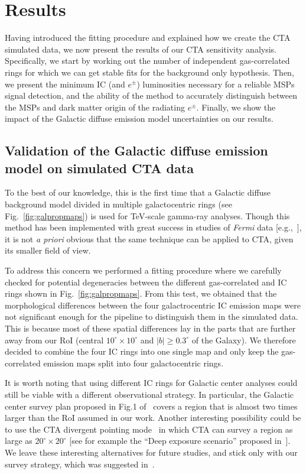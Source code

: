 \documentclass[doublespace,nopageskip]{VTthesis}
\begin{document}
\section{Results}
\label{sec:results_CTA}

Having introduced the fitting procedure and explained how we create the CTA simulated data, we now present the results of our CTA sensitivity analysis.
Specifically, we start by working out the number of independent gas-correlated rings for which we can get stable fits for the background only hypothesis. Then, we present the minimum IC (and $e^\pm$) luminosities necessary for a reliable MSPs signal detection, and the ability of the method to accurately distinguish between the MSPs and dark matter origin of the radiating $e^\pm$. Finally, we show the impact of the Galactic diffuse emission model uncertainties on our results.

\subsection{Validation of the Galactic diffuse emission model on simulated CTA data}
\label{subsec:validationGDE}

To the best of our knowledge, this is the first time that a Galactic diffuse background model divided in multiple galactocentric rings (see Fig.~\ref{fig:galpropmaps}) is used for TeV-scale gamma-ray analyses. Though this method has been implemented with great success in studies of \textit{Fermi} data [e.g.,~\citet{2020ApJS..247...33A}], it is not {\it a priori} obvious that the same technique can be applied to CTA, given its smaller field of view.

To address this concern
we performed a fitting procedure where we carefully checked for potential degeneracies between the different gas-correlated and IC rings shown in Fig.~\ref{fig:galpropmaps}. From this test, we obtained that the morphological differences between the four galactrocentric IC emission maps were not significant enough for the pipeline to distinguish them in the simulated data. This is because most of these spatial differences lay in the parts that are further away from our RoI (central $10^\circ\times10^\circ$ and $|b|\geq0.3^\circ$ of the Galaxy). We therefore decided to
combine the four IC rings into one single map and only keep the gas-correlated emission
maps split into four galactocentric rings.

It is worth noting that using different IC rings for Galactic center analyses could still be viable with a different observational strategy. In particular, the Galactic center survey plan proposed in Fig.1 of~\citet{2021JCAP...01..057A} covers a region that is almost two times larger than the RoI assumed in our work. Another interesting possibility could be to use the CTA divergent pointing mode~\citep{2015ICRC...34..725G} in which CTA can survey a region as large as $20^\circ \times 20^\circ$ [see for example the ``Deep exposure scenario'' proposed in~\cite{2021PDU....3200845C}]. We leave these interesting alternatives for future studies, and stick only with our survey strategy, which was suggested in~\citet{2021PhRvD.103b3011R}. 
\end{document}
